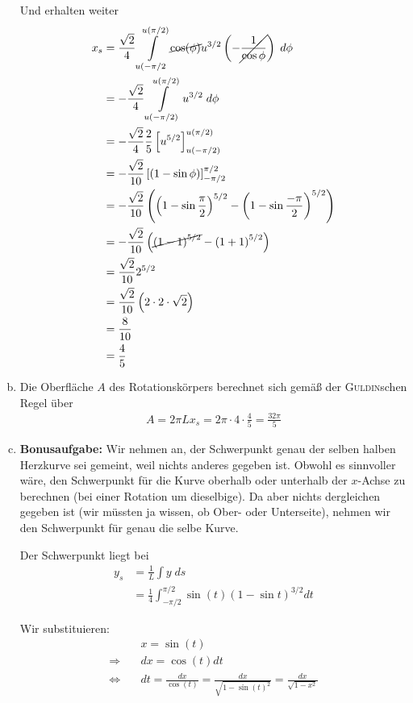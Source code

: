 \documentclass[a4paper,german,12pt,smallheadings]{scrartcl}
\begin{document}
\begin{enumerate}[a)]
    Und erhalten weiter
    \begin{align*}
      x_s &= \frac{\sqrt{2}}{4} \int\limits_{u(-\pi/2}^{u(\pi/2)} \cancel{\cos(\phi)} u^{3/2} \left(-\cancel{\frac{1}{\cos \phi}}\right) \; d\phi \\
          &= -\frac{\sqrt{2}}{4} \int\limits_{u(-\pi/2)}^{u(\pi/2)} u^{3/2} \; d\phi \\
          &= -\frac{\sqrt{2}}{4} \frac{2}{5} \left[u^{5/2}\right]_{u(-\pi/2)}^{u(\pi/2)} \\
          &= -\frac{\sqrt{2}}{10}\left[(1-\sin \phi)\right]_{-\pi/2}^{\pi/2} \\
          &= -\frac{\sqrt{2}}{10} \left(\left(1-\sin \frac{\pi}{2}\right)^{5/2} - \left(1-\sin \frac{-\pi}{2}\right)^{5/2}\right) \\
          &= -\frac{\sqrt{2}}{10} \left(\cancel{\left(1-1\right)^{5/2}} - \left(1+1\right)^{5/2}\right) \\
          &= \frac{\sqrt{2}}{10} 2^{5/2} \\
          &= \frac{\sqrt{2}}{10} \left(2\cdot2\cdot\sqrt{2}\right) \\
          &= \frac{8}{10} \\
          &= \frac{4}{5} \\
    \end{align*}
  \item
    Die Oberfläche $A$ des Rotationskörpers berechnet sich gemäß der
    \textsc{Guldin}schen Regel über
    \begin{align*}
      A = 2 \pi L x_s = 2 \pi \cdot 4 \cdot \frac{4}{5} = \frac{32 \pi}{5}
    \end{align*}
  \item
    \textbf{Bonusaufgabe:}
    Wir nehmen an, der Schwerpunkt genau der selben halben Herzkurve sei
    gemeint, weil nichts anderes gegeben ist. Obwohl es sinnvoller wäre, den
    Schwerpunkt für die Kurve oberhalb oder unterhalb der $x$-Achse zu
    berechnen (bei einer Rotation um dieselbige). Da aber nichts dergleichen
    gegeben ist (wir müssten ja wissen, ob Ober- oder Unterseite), nehmen wir
    den Schwerpunkt für genau die selbe Kurve.

    Der Schwerpunkt liegt bei
    \begin{align*}
      y_s &= \frac{1}{L} \int y \; ds \\
          &= \frac{1}{4} \int_{-\pi/2}^{\pi/2} \sin(t)(1-\sin t)^{3/2} dt
    \end{align*}

    Wir substituieren:
    \begin{align*}
      &x = \sin(t) \\
      \Rightarrow\quad&dx = \cos(t) dt \\
      \Leftrightarrow\quad& dt = \frac{dx}{\cos(t)} = \frac{dx}{\sqrt{1-\sin(t)^2}} = \frac{dx}{\sqrt{1-x^2}}
    \end{align*}


\end{enumerate}
\end{document}
